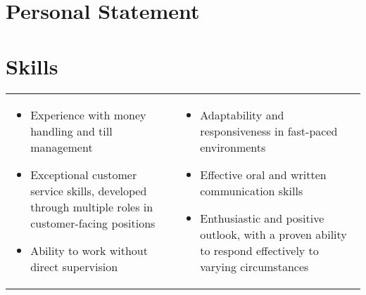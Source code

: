 \documentclass[letterpaper]{twentysecondcv} %
\begin{document}




\makeprofile %



\section*{Personal Statement}

\personalStatement





\section*{Skills}

\cvtags



\begin{tabularx}{\linewidth}{XX}
	\begin{itemize}
		\item Experience with money handling and till management
		\item Exceptional customer service skills, developed through multiple roles in customer-facing positions
		\item Ability to work without direct supervision
	\end{itemize} & 
	\begin{itemize}
		\item Adaptability and responsiveness in fast-paced environments
		\item Effective oral and written communication skills
		\item Enthusiastic and positive outlook, with a proven ability to respond effectively to varying circumstances
	\end{itemize} \\
\end{tabularx}
\end{document}
